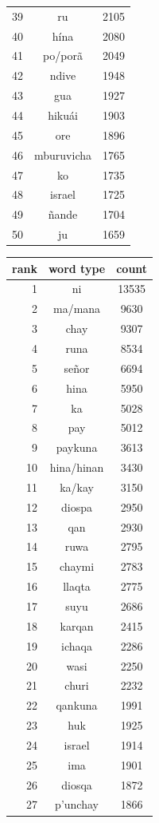 \begin{figure}
\begin{tiny}
\begin{centering}
\begin{tabular}{|r|c|c|}
39 & ru & 2105 \\
40 & hína & 2080 \\
41 & po/porã & 2049 \\
42 & ndive & 1948 \\
43 & gua & 1927 \\
44 & hikuái & 1903 \\
45 & ore & 1896 \\
46 & mburuvicha & 1765 \\
47 & ko & 1735 \\
48 & israel & 1725 \\
49 & ñande & 1704 \\
50 & ju & 1659 \\
    \hline
  \end{tabular}
  \quad
  \begin{tabular}{|r|c|c|}
    \hline
    rank & word type & count \\
    \hline
1 & ni & 13535 \\
2 & ma/mana & 9630 \\
3 & chay & 9307 \\
4 & runa & 8534 \\
5 & señor & 6694 \\
6 & hina & 5950 \\
7 & ka & 5028 \\
8 & pay & 5012 \\
9 & paykuna & 3613 \\
10 & hina/hinan & 3430 \\
11 & ka/kay & 3150 \\
12 & diospa & 2950 \\
13 & qan & 2930 \\
14 & ruwa & 2795 \\
15 & chaymi & 2783 \\
16 & llaqta & 2775 \\
17 & suyu & 2686 \\
18 & karqan & 2415 \\
19 & ichaqa & 2286 \\
20 & wasi & 2250 \\
21 & churi & 2232 \\
22 & qankuna & 1991 \\
23 & huk & 1925 \\
24 & israel & 1914 \\
25 & ima & 1901 \\
26 & diosqa & 1872 \\
27 & p'unchay & 1866 \\

\end{tabular}
\end{centering}
\end{tiny}
\end{figure}

